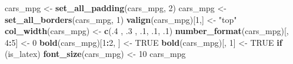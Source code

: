 \documentclass[]{article}
\newenvironment{Shaded}{\begin{snugshade}}{\end{snugshade}}
\newcommand{\KeywordTok}[1]{\textcolor[rgb]{0.13,0.29,0.53}{\textbf{#1}}}
\newcommand{\DecValTok}[1]{\textcolor[rgb]{0.00,0.00,0.81}{#1}}
\newcommand{\StringTok}[1]{\textcolor[rgb]{0.31,0.60,0.02}{#1}}
\newcommand{\OtherTok}[1]{\textcolor[rgb]{0.56,0.35,0.01}{#1}}
\newcommand{\ControlFlowTok}[1]{\textcolor[rgb]{0.13,0.29,0.53}{\textbf{#1}}}
\newcommand{\OperatorTok}[1]{\textcolor[rgb]{0.81,0.36,0.00}{\textbf{#1}}}
\newcommand{\NormalTok}[1]{#1}
\begin{document}
\begin{Shaded}
\begin{Highlighting}[]
\NormalTok{cars_mpg <-}\StringTok{ }\KeywordTok{set_all_padding}\NormalTok{(cars_mpg, }\DecValTok{2}\NormalTok{)}
\NormalTok{cars_mpg <-}\StringTok{ }\KeywordTok{set_all_borders}\NormalTok{(cars_mpg, }\DecValTok{1}\NormalTok{)}
\KeywordTok{valign}\NormalTok{(cars_mpg)[}\DecValTok{1}\NormalTok{,] <-}\StringTok{ "top"}
\KeywordTok{col_width}\NormalTok{(cars_mpg) <-}\StringTok{ }\KeywordTok{c}\NormalTok{(.}\DecValTok{4}\NormalTok{ , .}\DecValTok{3}\NormalTok{ , .}\DecValTok{1}\NormalTok{, .}\DecValTok{1}\NormalTok{, .}\DecValTok{1}\NormalTok{)}
\KeywordTok{number_format}\NormalTok{(cars_mpg)[, }\DecValTok{4}\OperatorTok{:}\DecValTok{5}\NormalTok{] <-}\StringTok{ }\DecValTok{0}
\KeywordTok{bold}\NormalTok{(cars_mpg)[}\DecValTok{1}\OperatorTok{:}\DecValTok{2}\NormalTok{, ] <-}\StringTok{ }\OtherTok{TRUE}
\KeywordTok{bold}\NormalTok{(cars_mpg)[, }\DecValTok{1}\NormalTok{] <-}\StringTok{ }\OtherTok{TRUE}
\ControlFlowTok{if}\NormalTok{ (is_latex) }\KeywordTok{font_size}\NormalTok{(cars_mpg) <-}\StringTok{ }\DecValTok{10}
\NormalTok{cars_mpg}
\end{Highlighting}
\end{Shaded}
\end{document}
